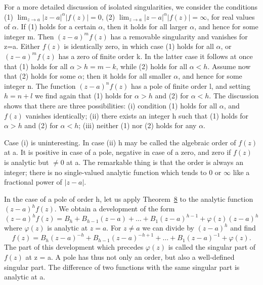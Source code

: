 For a more detailed discussion of isolated singularities, we consider the conditions (1) $\lim_{z\to a}|z-a|^{\alpha}|f(z)|=0$, (2) $\lim_{z\to a}|z-a|^{\alpha}|f(z)|=\infty$, for real values of $\alpha$. If (1) holds for a certain $\alpha$, then it holds for all larger $\alpha$, and hence for some integer m. Then $(z-a)^{m}f(z)$ has a removable singularity and vanishes for z=a. Either $f(z)$ is identically zero, in which case (1) holds for all $\alpha$, or $(z-a)^{m}f(z)$ has a zero of finite order k. In the latter case it follows at once that (1) holds for all $\alpha>h=m-k$, while (2) holds for all $\alpha<h$. Assume now that (2) holds for some $\alpha$; then it holds for all smaller $\alpha$, and hence for some integer n. The function $(z-a)^{n}f(z)$ has a pole of finite order l, and setting $h=n+l$ we find again that (1) holds for $\alpha>h$ and (2) for $\alpha<h$. The discussion shows that there are three possibilities: (i) condition (1) holds for all $\alpha$, and $f(z)$ vanishes identically; (ii) there exists an integer h such that (1) holds for $\alpha>h$ and (2) for $\alpha<h$; (iii) neither (1) nor (2) holds for any $\alpha$.

Case (i) is uninteresting. In case (ii) h may be called the algebraic order of $f(z)$ at a. It is positive in case of a pole, negative in case of a zero, and zero if $f(z)$ is analytic but $\neq 0$ at a. The remarkable thing is that the order is always an integer; there is no single-valued analytic function which tends to 0 or $\infty$ like a fractional power of $|z - a|$.

In the case of a pole of order h, let us apply Theorem~\hyperref[thm:4.8]{8} to the analytic function $(z - a)^{h}f(z)$. We obtain a development of the form
\begin{equation*}
(z - a) ^ {h} f (z) = B _ {h} + B _ {h - 1} (z - a) + \dots + B _ {1} (z - a) ^ {h - 1} + \varphi (z) (z - a) ^ {h}
\end{equation*}
where $\varphi(z)$ is analytic at $z = a$. For $z \neq a$ we can divide by $(z - a)^{h}$ and find
\begin{equation*}
f (z) = B _ {h} (z - a) ^ {- h} + B _ {h - 1} (z - a) ^ {- h + 1} + \dots + B _ {1} (z - a) ^ {- 1} + \varphi (z).
\end{equation*}
The part of this development which precedes $\varphi(z)$ is called the singular part of $f(z)$ at z = a. A pole has thus not only an order, but also a well-defined singular part. The difference of two functions with the same singular part is analytic at a.

